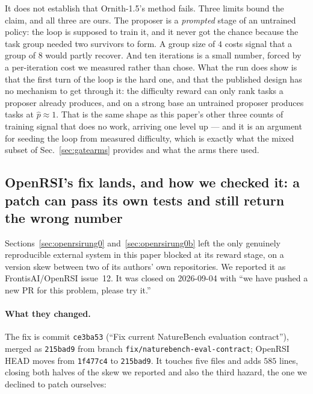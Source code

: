 It does not establish that Ornith-1.5's method fails. Three limits bound the claim, and all
three are ours. The proposer is a \emph{prompted} stage of an untrained policy: the loop is
supposed to train it, and it never got the chance because the task group needed two survivors
to form. A group size of $4$ costs signal that a group of $8$ would partly recover. And ten
iterations is a small number, forced by a per-iteration cost we measured rather than chose.
What the run does show is that the first turn of the loop is the hard one, and that the
published design has no mechanism to get through it: the difficulty reward can only rank tasks
a proposer already produces, and on a strong base an untrained proposer produces tasks at
$\hat p \approx 1$. That is the same shape as this paper's other three counts of training
signal that does no work, arriving one level up --- and it is an argument for seeding the loop
from measured difficulty, which is exactly what the mixed subset of Sec.~\ref{sec:gatearms}
provides and what the arms there used.

\subsection{OpenRSI's fix lands, and how we checked it: a patch can pass its own tests and
still return the wrong number}
\label{sec:openrsifix}

Sections~\ref{sec:openrsirung0} and~\ref{sec:openrsirung0b} left the only genuinely
reproducible external system in this paper blocked at its reward stage, on a version skew
between two of its authors' own repositories. We reported it as FrontisAI/OpenRSI issue~12.
It was closed on 2026-09-04 with ``we have pushed a new PR for this problem, please try it.''

\paragraph{What they changed.}
The fix is commit \texttt{ce3ba53} (``Fix current NatureBench evaluation contract''), merged
as \texttt{215bad9} from branch \texttt{fix/naturebench-eval-contract}; OpenRSI HEAD moves
from \texttt{1f477c4} to \texttt{215bad9}. It touches five files and adds $585$ lines,
closing both halves of the skew we reported and also the third hazard, the one we declined to
patch ourselves:

